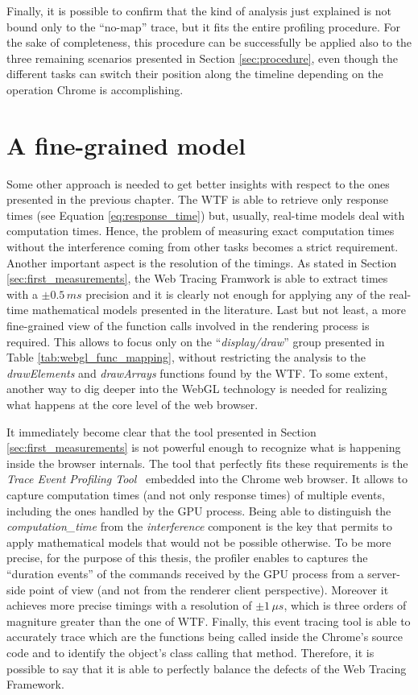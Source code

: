 Finally, it is possible to confirm that the kind of analysis just explained is
not bound only to the ``no-map'' trace, but it fits the entire profiling
procedure. For the sake of completeness, this procedure can be successfully be
applied also to the three remaining
scenarios presented in Section \ref{sec:procedure}, even though the different
tasks can switch their position along the timeline depending on the operation
Chrome is accomplishing.


\section{A fine-grained model}
Some other approach is needed to get better insights with respect to the ones
presented in the previous chapter. The WTF is able to retrieve only response
times (see Equation \ref{eq:response_time}) but, usually, real-time models
deal with computation times.
Hence, the problem of measuring exact computation
times without the interference coming from other tasks becomes a strict requirement.
Another important aspect is the resolution of the timings. As stated in Section
\ref{sec:first_measurements}, the Web Tracing Framwork is able to extract times with a
\( \pm 0.5\,ms \) precision and it is clearly not enough for applying any of
the real-time mathematical models presented in the literature.
Last but not least, a more fine-grained view of the function calls involved in
the rendering process is required. This allows to focus only on the
``\emph{display/draw}'' group presented in Table \ref{tab:webgl_func_mapping},
without restricting the analysis to the \emph{drawElements} and \emph{drawArrays}
functions found by the WTF. To some extent, another way to dig deeper into the
WebGL technology is needed for realizing what happens at the core level of the
web browser.

It immediately become clear that the tool presented in Section \ref{sec:first_measurements}
is not powerful enough to recognize what is happening inside the browser internals.
The tool that perfectly fits these requirements is the \emph{Trace Event Profiling
Tool}~\cite{eventprofilertool} embedded into the Chrome web browser.
It allows to capture computation times (and not only response times) of multiple
events, including the ones handled by the GPU process. Being able to distinguish
the \emph{computation\_time} from the \emph{interference} component is the key
that permits to apply mathematical models that would not be possible otherwise.
To be more precise, for the purpose of this thesis,
the profiler enables to captures the ``duration events'' of the commands received by the GPU
process from a server-side point of view (and not from the renderer client perspective).
Moreover it achieves more precise timings with a resolution of \(\pm 1\,\mu s\),
which is three orders of magniture greater than the one of WTF.
Finally, this event tracing tool is able to accurately trace which are the functions
being called inside the Chrome's source code and to identify the object's class
calling that method. Therefore, it is possible to say that it is able to perfectly
balance the defects of the Web Tracing Framework.

